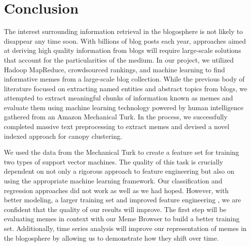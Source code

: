 \documentclass{sig-alternate}
\begin{document}
\section{Conclusion}
The interest surrounding information retrieval in the blogosphere is not likely to disappear any time soon. With billions of blog posts each year, approaches aimed at deriving high quality information from blogs will require large-scale solutions that account for the particularities of the medium. In our project, we utilized Hadoop MapReduce, crowdsourced rankings, and machine learning to find informative memes from a large-scale blog collection. While the previous body of literature focused on extracting named entities and abstract topics from blogs, we attempted to extract meaningful chunks of information known as memes and evaluate them using machine learning technology powered by human intelligence gathered from an Amazon Mechanical Turk. In the process, we successfully completed massive text preprocessing to extract memes and devised a novel indexed approach for canopy clustering.

We used the data from the Mechanical Turk to create a feature set for training two types of support vector machines. The quality of this task is crucially dependent on not only a rigorous approach to feature engineering but also on using the appropriate machine learning framework. Our classification and regression approaches did not work as well as we had hoped. However, with better modeling, a larger training set and improved feature engineering , we are confident that the quality of our results will improve. The first step will be evaluating memes in context with our Meme Browser to build a better training set. Additionally, time series analysis will improve our representation of memes in the blogosphere by allowing us to demonstrate how they shift over time.

%

\end{document}
